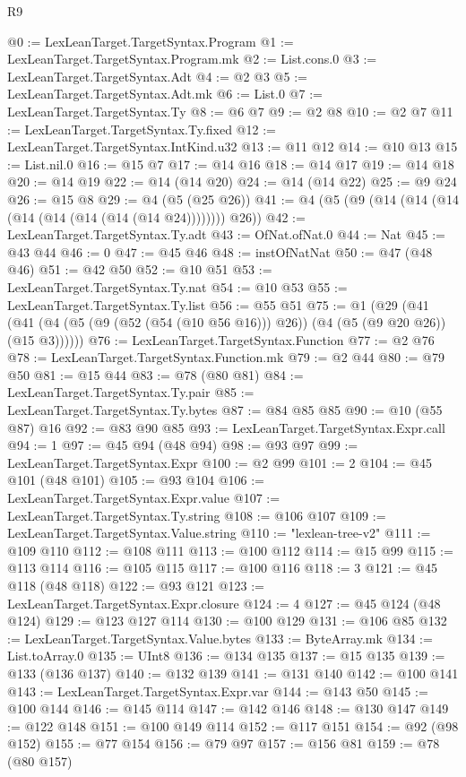 \begin{lexlean}{R9}
\begin{coremodule}
@0 := LexLeanTarget.TargetSyntax.Program
@1 := LexLeanTarget.TargetSyntax.Program.mk
@2 := List.cons.{0}
@3 := LexLeanTarget.TargetSyntax.Adt
@4 := @2 @3
@5 := LexLeanTarget.TargetSyntax.Adt.mk
@6 := List.{0}
@7 := LexLeanTarget.TargetSyntax.Ty
@8 := @6 @7
@9 := @2 @8
@10 := @2 @7
@11 := LexLeanTarget.TargetSyntax.Ty.fixed
@12 := LexLeanTarget.TargetSyntax.IntKind.u32
@13 := @11 @12
@14 := @10 @13
@15 := List.nil.{0}
@16 := @15 @7
@17 := @14 @16
@18 := @14 @17
@19 := @14 @18
@20 := @14 @19
@22 := @14 (@14 @20)
@24 := @14 (@14 @22)
@25 := @9 @24
@26 := @15 @8
@29 := @4 (@5 (@25 @26))
@41 := @4 (@5 (@9 (@14 (@14 (@14 (@14 (@14 (@14 (@14 (@14 @24)))))))) @26))
@42 := LexLeanTarget.TargetSyntax.Ty.adt
@43 := OfNat.ofNat.{0}
@44 := Nat
@45 := @43 @44
@46 := 0
@47 := @45 @46
@48 := instOfNatNat
@50 := @47 (@48 @46)
@51 := @42 @50
@52 := @10 @51
@53 := LexLeanTarget.TargetSyntax.Ty.nat
@54 := @10 @53
@55 := LexLeanTarget.TargetSyntax.Ty.list
@56 := @55 @51
@75 := @1
    (@29 (@41 (@41 (@4 (@5 (@9 (@52 (@54 (@10 @56 @16))) @26)) (@4 (@5 (@9 @20 @26)) (@15 @3))))))
@76 := LexLeanTarget.TargetSyntax.Function
@77 := @2 @76
@78 := LexLeanTarget.TargetSyntax.Function.mk
@79 := @2 @44
@80 := @79 @50
@81 := @15 @44
@83 := @78 (@80 @81)
@84 := LexLeanTarget.TargetSyntax.Ty.pair
@85 := LexLeanTarget.TargetSyntax.Ty.bytes
@87 := @84 @85 @85
@90 := @10 (@55 @87) @16
@92 := @83 @90 @85
@93 := LexLeanTarget.TargetSyntax.Expr.call
@94 := 1
@97 := @45 @94 (@48 @94)
@98 := @93 @97
@99 := LexLeanTarget.TargetSyntax.Expr
@100 := @2 @99
@101 := 2
@104 := @45 @101 (@48 @101)
@105 := @93 @104
@106 := LexLeanTarget.TargetSyntax.Expr.value
@107 := LexLeanTarget.TargetSyntax.Ty.string
@108 := @106 @107
@109 := LexLeanTarget.TargetSyntax.Value.string
@110 := "lexlean-tree-v2"
@111 := @109 @110
@112 := @108 @111
@113 := @100 @112
@114 := @15 @99
@115 := @113 @114
@116 := @105 @115
@117 := @100 @116
@118 := 3
@121 := @45 @118 (@48 @118)
@122 := @93 @121
@123 := LexLeanTarget.TargetSyntax.Expr.closure
@124 := 4
@127 := @45 @124 (@48 @124)
@129 := @123 @127 @114
@130 := @100 @129
@131 := @106 @85
@132 := LexLeanTarget.TargetSyntax.Value.bytes
@133 := ByteArray.mk
@134 := List.toArray.{0}
@135 := UInt8
@136 := @134 @135
@137 := @15 @135
@139 := @133 (@136 @137)
@140 := @132 @139
@141 := @131 @140
@142 := @100 @141
@143 := LexLeanTarget.TargetSyntax.Expr.var
@144 := @143 @50
@145 := @100 @144
@146 := @145 @114
@147 := @142 @146
@148 := @130 @147
@149 := @122 @148
@151 := @100 @149 @114
@152 := @117 @151
@154 := @92 (@98 @152)
@155 := @77 @154
@156 := @79 @97
@157 := @156 @81
@159 := @78 (@80 @157)

\end{coremodule}
\end{lexlean}
